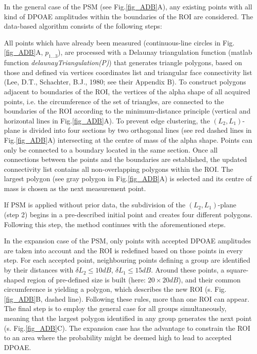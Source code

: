 \documentclass[journal,twoside,web]{ieeecolor2}
\begin{document}
In the general case of the PSM (see Fig.\ref{fig_ADB}A), any existing points with all kind of DPOAE amplitudes within the boundaries of the ROI are considered. The data-based algorithm consists of the following steps:
\begin{algorithmic}[1]
\STATE All points which have already been measured (continuous-line circles in Fig.\ref{fig_ADB}A, $p_{1...3}$), are processed with a Delaunay triangulation function (matlab function \textit{delaunayTriangulation(P)}) that generates triangle polygons, based on those and defined via vertices coordinates list and triangular face connectivity list (Lee, D.T., Schachter, B.J., 1980; see their Appendix B).
\STATE To construct polygons adjacent to boundaries of the ROI, the vertices of the alpha shape of all acquired points, i.e. the circumference of the set of triangles, are connected to the boundaries of the ROI according to the minimum-distance principle (vertical and horizontal lines in Fig.\ref{fig_ADB}A). To prevent edge clustering, the $(L_2, L_1)$-plane is divided into four sections by two orthogonal lines (see red dashed lines in Fig.\ref{fig_ADB}A) intersecting at the centre of mass of the alpha shape. Points can only be connected to a boundary located in the same section.
\STATE Once all connections between the points and the boundaries are established, the updated connectivity list contains all non-overlapping polygons within the ROI. The largest polygon (see gray polygon in Fig.\ref{fig_ADB}A) is selected and its centre of mass is chosen as the next measurement point.
\end{algorithmic} 

If PSM is applied without prior data, the subdivision of the $(L_2, L_1)$-plane (step 2) begins in a pre-described initial point and creates four different polygons. Following this step, the method continues with the aforementioned steps.

In the expansion case of the PSM, only points with accepted DPOAE amplitudes are taken into account and the ROI is redefined based on those points in every step. For each accepted point, neighbouring points defining a group are identified by their distances with $\delta L_2 \le 10 dB$, $\delta L_1 \le 15 dB$. Around these points, a square-shaped region of pre-defined size is built (here: $20 \times 20 dB$), and their common circumference is yielding a polygon, which describes the new ROI (s. Fig.\ref{fig_ADB}B, dashed line). Following these rules, more than one ROI can appear. The final step is to employ the general case for all groups simultaneously, meaning that the largest polygon identified in any group generates the next point (s. Fig.\ref{fig_ADB}C). The expansion case has the advantage to constrain the ROI to an area where the probability might be deemed high to lead to accepted DPOAE.
\end{document}
